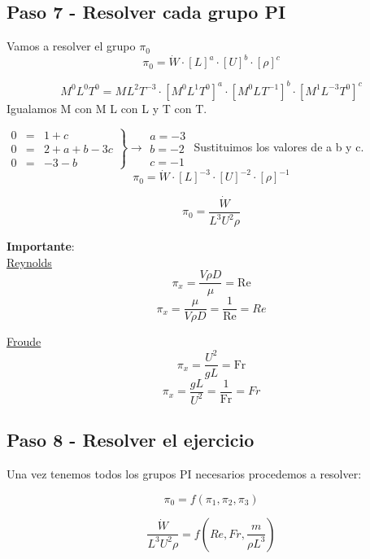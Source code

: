 \documentclass[10pt,a4paper]{article}
\begin{document}
\subsection{Paso 7 - Resolver cada grupo PI}
Vamos a resolver el grupo $\pi_0$
$$
\pi_0 = \dot{W} \cdot \left[L \right]^a \cdot \left[U \right]^b \cdot \left[\rho \right]^c
$$

$$
M^{0}L^{0}T^{0} = M^{}L^{2}T^{-3} \cdot \left[M^{0}L^{1}T^{0} \right]^a \cdot \left[M^{0}L^{}T^{-1} \right]^b \cdot \left[M^{1}L^{-3}T^{0} \right]^c
$$
\vspace{0.3cm}
Igualamos M con M L con L y T con T.

$
\left.
\begin{array}{rcl}
    0 & = & 1+c\\
    0 & = & 2+a+b-3c \\
    0 & = & -3-b
\end{array}
\right\}
\xrightarrow{}
\begin{array}{rcl}
    a = -3 \\
    b = -2 \\ 
    c = -1
\end{array}
$
Sustituimos los valores de a b y c.
$$
\pi_0 = \dot{W} \cdot \left[L \right]^{-3} \cdot \left[U \right]^{-2} \cdot \left[\rho \right]^{-1}
$$

$$
\pi_0 = \frac{\dot{W}}{L^3 U^2 \rho}
$$

\textbf{Importante}:
\\

\underline{Reynolds}
$$
\pi_x = \frac{V \rho D}{\mu} = \text{Re}
$$
$$
\pi_x = \frac{\mu}{V \rho D} = \frac{1}{\text{Re}} = Re
$$

\underline{Froude}
$$
\pi_x = \frac{U^2}{g L} = \text{Fr}
$$
$$
\pi_x = \frac{g L}{U^2} = \frac{1}{\text{Fr}} = Fr
$$

\subsection{Paso 8 - Resolver el ejercicio}
Una vez tenemos todos los grupos PI necesarios procedemos a resolver:

$$
\pi_0 = f\left(\pi_1,\pi_2,\pi_3 \right)
$$

$$
\frac{\dot{W}}{L^3 U^2 \rho}= f\left(Re,Fr,\frac{m}{\rho L^3}\right)
$$
\end{document}
